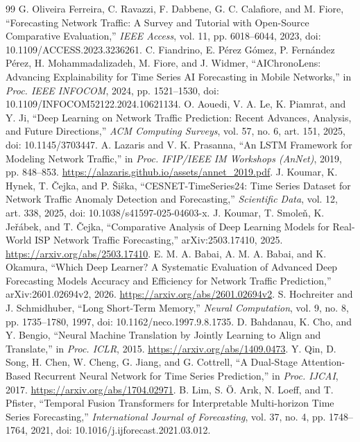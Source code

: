 \documentclass[conference]{IEEEtran}
\begin{document}
\begin{thebibliography}{99}
 G. Oliveira Ferreira, C. Ravazzi, F. Dabbene, G. C. Calafiore, and M. Fiore, ``Forecasting Network Traffic: A Survey and Tutorial with Open-Source Comparative Evaluation,'' \emph{IEEE Access}, vol. 11, pp. 6018--6044, 2023, doi: 10.1109/ACCESS.2023.3236261.
 C. Fiandrino, E. P\'erez G\'omez, P. Fern\'andez P\'erez, H. Mohammadalizadeh, M. Fiore, and J. Widmer, ``AIChronoLens: Advancing Explainability for Time Series AI Forecasting in Mobile Networks,'' in \emph{Proc. IEEE INFOCOM}, 2024, pp. 1521--1530, doi: 10.1109/INFOCOM52122.2024.10621134.
 O. Aouedi, V. A. Le, K. Piamrat, and Y. Ji, ``Deep Learning on Network Traffic Prediction: Recent Advances, Analysis, and Future Directions,'' \emph{ACM Computing Surveys}, vol. 57, no. 6, art. 151, 2025, doi: 10.1145/3703447.
 A. Lazaris and V. K. Prasanna, ``An LSTM Framework for Modeling Network Traffic,'' in \emph{Proc. IFIP/IEEE IM Workshops (AnNet)}, 2019, pp. 848--853. \url{https://alazaris.github.io/assets/annet_2019.pdf}.
 J. Koumar, K. Hynek, T. \v{C}ejka, and P. \v{S}i\v{s}ka, ``CESNET-TimeSeries24: Time Series Dataset for Network Traffic Anomaly Detection and Forecasting,'' \emph{Scientific Data}, vol. 12, art. 338, 2025, doi: 10.1038/s41597-025-04603-x.
 J. Koumar, T. Smole\v{n}, K. Je\v{r}\'abek, and T. \v{C}ejka, ``Comparative Analysis of Deep Learning Models for Real-World ISP Network Traffic Forecasting,'' arXiv:2503.17410, 2025. \url{https://arxiv.org/abs/2503.17410}.
 E. M. A. Babai, A. M. A. Babai, and K. Okamura, ``Which Deep Learner? A Systematic Evaluation of Advanced Deep Forecasting Models Accuracy and Efficiency for Network Traffic Prediction,'' arXiv:2601.02694v2, 2026. \url{https://arxiv.org/abs/2601.02694v2}.
 S. Hochreiter and J. Schmidhuber, ``Long Short-Term Memory,'' \emph{Neural Computation}, vol. 9, no. 8, pp. 1735--1780, 1997, doi: 10.1162/neco.1997.9.8.1735.
 D. Bahdanau, K. Cho, and Y. Bengio, ``Neural Machine Translation by Jointly Learning to Align and Translate,'' in \emph{Proc. ICLR}, 2015. \url{https://arxiv.org/abs/1409.0473}.
 Y. Qin, D. Song, H. Chen, W. Cheng, G. Jiang, and G. Cottrell, ``A Dual-Stage Attention-Based Recurrent Neural Network for Time Series Prediction,'' in \emph{Proc. IJCAI}, 2017. \url{https://arxiv.org/abs/1704.02971}.
 B. Lim, S. \"O. Ar\i k, N. Loeff, and T. Pfister, ``Temporal Fusion Transformers for Interpretable Multi-horizon Time Series Forecasting,'' \emph{International Journal of Forecasting}, vol. 37, no. 4, pp. 1748--1764, 2021, doi: 10.1016/j.ijforecast.2021.03.012.

\end{thebibliography}
\end{document}

